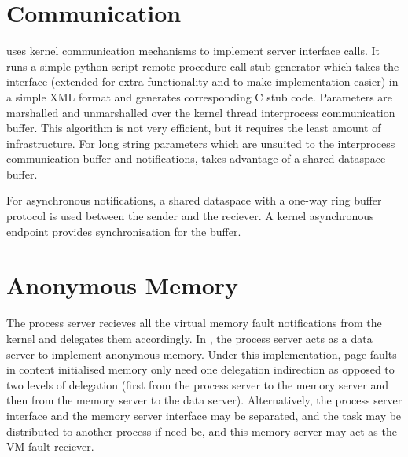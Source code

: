 \section{Communication}

 uses kernel communication mechanisms to implement server interface calls. It runs a simple python script remote procedure call stub generator which takes the  interface (extended for extra functionality and to make implementation easier) in a simple XML format and generates corresponding C stub code. Parameters are marshalled and unmarshalled over the kernel thread interprocess communication buffer. This algorithm is not very efficient, but it requires the least amount of infrastructure. For long string parameters which are unsuited to the interprocess communication buffer and notifications,  takes advantage of a shared dataspace buffer.

For asynchronous notifications, a shared dataspace with a one-way ring buffer protocol is used between the sender and the reciever. A kernel asynchronous endpoint provides synchronisation for the buffer.


\section{Anonymous Memory}

The process server recieves all the virtual memory fault notifications from the kernel and delegates them accordingly. In , the process server acts as a data server to implement anonymous memory. Under this implementation, page faults in content initialised memory only need one delegation indirection as opposed to two levels of delegation (first from the process server to the memory server and then from the memory server to the data server). Alternatively, the process server interface and the memory server interface may be separated, and the task may be distributed to another process if need be, and this memory server may act as the VM fault reciever.
